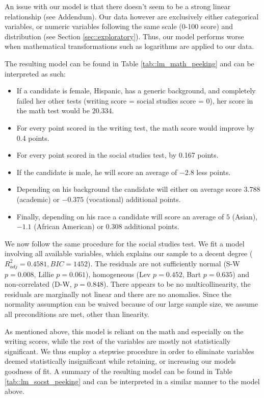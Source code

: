 \documentclass[10pt, a4paper]{article}
\begin{document}
	An issue with our model is that there doesn't seem to be a strong linear relationship (see Addendum). Our data however are exclusively either categorical variables, or numeric variables following the same scale (0-100 score) and distribution (see Section \ref{sec::exploratory}). Thus, our model performs worse when mathematical transformations such as logarithms are applied to our data.
	
	The resulting model can be found in Table \ref{tab::lm_math_peeking} and can be interpreted as such: 
	\begin{itemize}
		\item If a candidate is female, Hispanic, has a generic background, and completely failed her other tests (writing score = social studies score = 0), her score in the math test would be $20.334$. 
		\item For every point scored in the writing test, the math score would improve by 0.4 points.
		\item For every point scored in the social studies test, by 0.167 points.
		\item If the candidate is male, he will score an average of $-2.8$ less points.
		\item Depending on his background the candidate will either on average score $3.788$ (academic) or $-0.375$ (vocational) additional points.
		\item Finally, depending on his race a candidate will score an average of $5$ (Asian), $-1.1$ (African American) or $0.308$ additional points.
	\end{itemize}

	We now follow the same procedure for the social studies test. We fit a model involving all available variables, which explains our sample to a decent degree ($R^2_{adj} = 0.4581, BIC=1452$). The residuals are not sufficiently normal (S-W $p = 0.008$, Lillie $p=0.061$), homogeneous (Lev $p = 0.452$, Bart $p = 0.635$) and non-correlated (D-W, $p=0.848$). There appears to be no multicollinearity, the residuals are marginally not linear and there are no anomalies. Since the normality assumption can be waived because of our large sample size, we assume all preconditions are met, other than linearity.
	
	As mentioned above, this model is reliant on the math and especially on the writing scores, while the rest of the variables are mostly not statistically significant. We thus employ a stepwise procedure in order to eliminate variables deemed statistically insignificant while retaining, or increasing our models goodness of fit. A summary of the resulting model can be found in Table \ref{tab::lm_socst_peeking} and can be interpreted in a similar manner to the model above.
	
\end{document}
